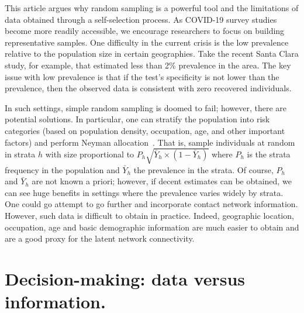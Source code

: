 \documentclass[aoas]{amsart}
\begin{document}
This article argues why random sampling is a powerful tool and the limitations of data obtained through a self-selection process.  As COVID-19 survey studies become more readily accessible, we encourage researchers to focus on building representative samples.  One difficulty in the current crisis is the low prevalence relative to the population size in certain geographies.  Take the recent Santa Clara study, for example, that estimated less than 2\% prevalence in the area.  The key issue with low prevalence is that if the test's specificity is not lower than the prevalence, then the observed data is consistent with zero recovered individuals.

In such settings, simple random sampling is doomed to fail; however, there are potential solutions.  In particular, one can stratify the population into risk categories (based on population density, occupation, age, and other important factors) and perform Neyman allocation~\citep{Cochran77}.  That is, sample individuals at random in strata $h$ with size proportional to $P_h \sqrt{\bar Y_h \times (1-\bar Y_h)}$ where $P_h$ is the strata frequency in the population and $\bar Y_h$ the prevalence in the strata. Of course, $P_h$ and $\bar Y_h$ are not known a priori; however, if decent estimates can be obtained, we can see huge benefits in settings where the prevalence varies widely by strata. One could go attempt to go further and incorporate contact network information.  However, such data is difficult to obtain in practice.  Indeed, geographic location, occupation, age and basic demographic information are much easier to obtain and are a good proxy for the latent network connectivity.

\section{Decision-making: data versus information.}
\end{document}
